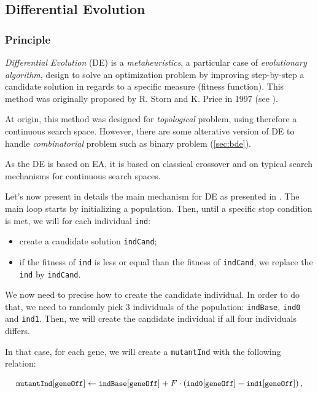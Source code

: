 \documentclass[12pt, openany]{article}
\begin{document}
\subsection{Differential Evolution}\label{sec:DE_theory}

\subsubsection{Principle}\label{sec:DE_theory_principle}

\emph{Differential Evolution} (DE) is a \emph{metaheuristics}, a particular case of \emph{evolutionary algorithm}, design to solve an optimization problem by improving step-by-step a candidate solution in regards to a specific measure (fitness function). This method was originally proposed by R. Storn and K. Price in 1997 (see \cite{storn1997differential}).

At origin, this method was designed for \emph{topological} problem, using therefore a continuous search space. However, there are some alterative version of DE to handle \emph{combinatorial} problem such as binary problem (\ref{sec:bde}).

As the DE is based on EA, it is based on classical crossover and on typical search mechanisms for continuous search spaces.

Let's now present in details the main mechanism for DE as presented in \cite{przewozniczek_de}. The main loop starts by initializing a population. Then, until a specific stop condition is met, we will for each individual \texttt{ind}:

\begin{itemize}
    \item create a candidate solution \texttt{indCand};
    \item if the fitness of \texttt{ind} is less or equal than the fitness of \texttt{indCand}, we replace the \texttt{ind} by \texttt{indCand}.
\end{itemize}

We now need to precise how to create the candidate individual. In order to do that, we need to randomly pick 3 individuals of the population: \texttt{indBase}, \texttt{ind0} and \texttt{ind1}. Then, we will create the candidate individual if all four individuals differs.

In that case, for each gene, we will create a \texttt{mutantInd} with the following relation:

\begin{equation}
    \small \texttt{mutantInd}[\texttt{geneOff}] \leftarrow \texttt{indBase}[\texttt{geneOff}] + F \cdot \left(\texttt{ind0}[\texttt{geneOff}] - \texttt{ind1}[\texttt{geneOff}]\right),
\end{equation}
\end{document}
